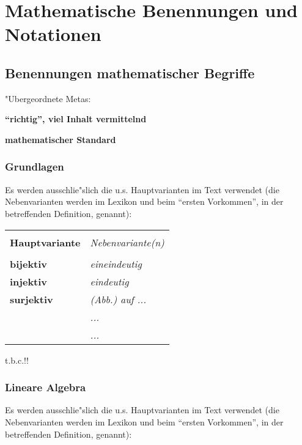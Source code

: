 \section{Mathematische Benennungen und Notationen}\label{benennung_notation_math_style}


\subsection{Benennungen mathematischer Begriffe}\label{benennung_style}

"Ubergeordnete Metas:

\begin{list_sabina}
\item
\textbf{``richtig'', viel Inhalt vermittelnd}
\item
\textbf{mathematischer Standard}
\end{list_sabina}


\subsubsection{Grundlagen}\label{benennung_style_grundlagen}


Es werden ausschlie"slich die u.s. Hauptvarianten im Text verwendet
(die Nebenvarianten werden im Lexikon und beim ``ersten Vorkommen'',
in der betreffenden Definition, genannt):


\begin{tabular}{!{\vrule width 1pt} >{\bfseries}m{7.5cm} | >{\itshape}m{7.5cm} !{\vrule width 1pt}}
\hline
\hline
 & \\
Hauptvariante & Nebenvariante(n)\\
& \\
\hline
\hline
bijektiv & eineindeutig \\
\hline
injektiv & eindeutig \\
\hline
surjektiv & (Abb.) auf ...\\
\hline
& ...\\
\hline
& ...\\
\hline
\hline
\end{tabular}

t.b.c.!!


\clearpage


\subsubsection{Lineare Algebra}\label{benennung_style_lina}


Es werden ausschlie"slich die u.s. Hauptvarianten im Text verwendet
(die Nebenvarianten werden im Lexikon und beim ``ersten Vorkommen'',
in der betreffenden Definition, genannt):


